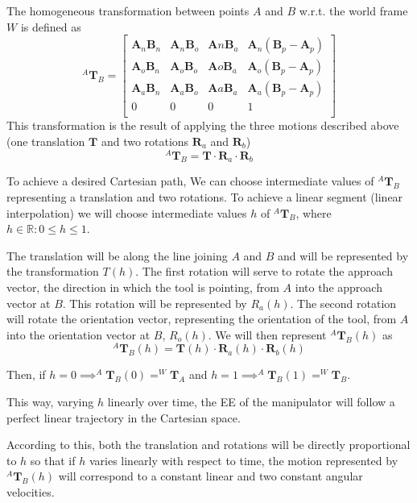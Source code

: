 \documentclass[10pt, aspectratio=169]{beamer}
\theoremstyle{remark}
\theoremstyle{definition}
\begin{document}
\begin{frame}[allowframebreaks]
\framebreak

The homogeneous transformation between points $A$ and $B$ w.r.t. the world frame $W$ is defined as
$$
^A\mathbf{T}_B = \begin{bmatrix}
    \mathbf{A}_n\mathbf{B}_n & \mathbf{A}_n\mathbf{B}_o & \mathbf{A}n\mathbf{B}_a & \mathbf{A}_{n}(\mathbf{B}_p - \mathbf{A}_p) \\
    \mathbf{A}_o\mathbf{B}_n & \mathbf{A}_o\mathbf{B}_o & \mathbf{A}o\mathbf{B}_a & \mathbf{A}_{o}(\mathbf{B}_p - \mathbf{A}_p) \\
    \mathbf{A}_a\mathbf{B}_n & \mathbf{A}_a\mathbf{B}_o & \mathbf{A}a\mathbf{B}_a & \mathbf{A}_{a}(\mathbf{B}_p - \mathbf{A}_p) \\
    0 & 0 & 0 & 1 \\
\end{bmatrix}
$$
This transformation is the result of applying the three motions described above (one translation $\mathbf{T}$ and two rotations $\mathbf{R}_a$ and $\mathbf{R}_b$)
$$
^A\mathbf{T}_B = \mathbf{T} \cdot \mathbf{R}_a \cdot\mathbf{R}_b
$$

To achieve a desired Cartesian path, We can choose intermediate values of $^A\mathbf{T}_B $ representing a translation and two rotations. To achieve a linear segment (linear interpolation) we will choose intermediate values $h$ of $^A\mathbf{T}_B$, where $h\in\mathbb{R} : 0\leq h \leq 1$. 

\framebreak

The translation will be along the line joining $A$ and $B$ and will be represented by the transformation $T(h)$. The first rotation will serve to rotate the approach vector, the direction in which the tool is pointing, from $A$ into the approach vector at $B$. This rotation will be represented by $R_a(h)$. The second rotation will rotate the orientation vector, representing the orientation of the tool, from $A$ into the orientation vector at $B$, $R_o(h)$. We will then represent $^A\mathbf{T}_B(h)$ as
$$
^A\mathbf{T}_B(h) = \mathbf{T}(h) \cdot \mathbf{R}_a(h) \cdot \mathbf{R}_b(h)
$$

Then, if $h=0 \implies ^A\mathbf{T}_B(0) = ^W\mathbf{T}_A$ and $h=1 \implies ^A\mathbf{T}_B(1) = ^W\mathbf{T}_B$.



\framebreak 

This way, varying $h$ linearly over time, the EE of the manipulator will follow a perfect linear trajectory in the Cartesian space.

According to this, both the translation and rotations will be directly proportional to $h$ so that if $h$ varies linearly with respect to time,  the motion represented by $^A\mathbf{T}_B(h)$ will correspond to a constant linear and two constant angular velocities. 


\end{frame}
\end{document}
